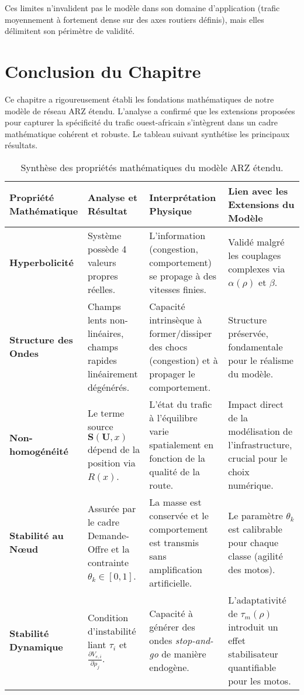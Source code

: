 Ces limites n'invalident pas le modèle dans son domaine d'application (trafic moyennement à fortement dense sur des axes routiers définis), mais elles délimitent son périmètre de validité.

\section{Conclusion du Chapitre}
Ce chapitre a rigoureusement établi les fondations mathématiques de notre modèle de réseau ARZ étendu. L'analyse a confirmé que les extensions proposées pour capturer la spécificité du trafic ouest-africain s'intègrent dans un cadre mathématique cohérent et robuste. Le tableau suivant synthétise les principaux résultats.

\begin{table}[h]
\centering
\begin{tabular}{|l|p{4cm}|p{4cm}|p{4cm}|}
\hline
\textbf{Propriété Mathématique} & \textbf{Analyse et Résultat} & \textbf{Interprétation Physique} & \textbf{Lien avec les Extensions du Modèle} \\
\hline
\textbf{Hyperbolicité} & Système possède 4 valeurs propres réelles. & L'information (congestion, comportement) se propage à des vitesses finies. & Validé malgré les couplages complexes via $\alpha(\rho)$ et $\beta$. \\
\hline
\textbf{Structure des Ondes} & Champs lents non-linéaires, champs rapides linéairement dégénérés. & Capacité intrinsèque à former/dissiper des chocs (congestion) et à propager le comportement. & Structure préservée, fondamentale pour le réalisme du modèle. \\
\hline
\textbf{Non-homogénéité} & Le terme source $\mathbf{S}(\mathbf{U}, x)$ dépend de la position via $R(x)$. & L'état du trafic à l'équilibre varie spatialement en fonction de la qualité de la route. & Impact direct de la modélisation de l'infrastructure, crucial pour le choix numérique. \\
\hline
\textbf{Stabilité au Nœud} & Assurée par le cadre Demande-Offre et la contrainte $\theta_k \in [0,1]$. & La masse est conservée et le comportement est transmis sans amplification artificielle. & Le paramètre $\theta_k$ est calibrable pour chaque classe (agilité des motos). \\
\hline
\textbf{Stabilité Dynamique} & Condition d'instabilité liant $\tau_i$ et $\frac{\partial V_{e,i}}{\partial \rho_j}$. & Capacité à générer des ondes \textit{stop-and-go} de manière endogène. & L'adaptativité de $\tau_m(\rho)$ introduit un effet stabilisateur quantifiable pour les motos. \\
\hline
\end{tabular}
\caption{Synthèse des propriétés mathématiques du modèle ARZ étendu.}
\end{table}

